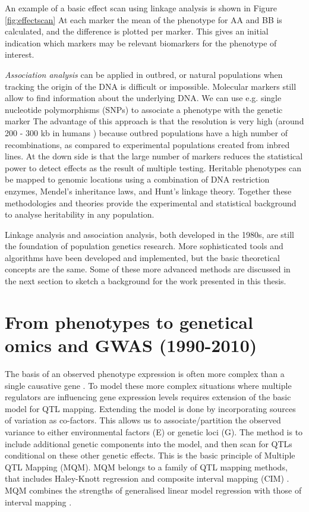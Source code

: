 An example of a basic effect scan using linkage analysis is shown in Figure \ref{fig:effectscan} At each marker the mean of 
the phenotype for AA and BB is calculated, and the difference is plotted per marker. This gives an initial indication which 
markers may be relevant biomarkers for the phenotype of interest.

\emph{Association analysis} can be applied in outbred, or natural populations when tracking the origin of the DNA is difficult 
or impossible. Molecular markers still allow to find information about the underlying DNA. We can use e.g. single nucleotide 
polymorphisms (SNPs) to associate a phenotype with the genetic marker \cite{Mehta:2013} The advantage of this approach is that 
the resolution is very high (around 200 - 300 kb in humans \cite{HapMap:2005}) because outbred populations have a high number of 
recombinations, as compared to experimental populations created from inbred lines. At the down side is that the large number of markers reduces the statistical 
power to detect effects as the result of multiple testing. Heritable phenotypes can be mapped to genomic locations using a 
combination of DNA restriction enzymes, Mendel's inheritance laws, and Hunt's linkage theory. Together these methodologies and 
theories provide the experimental and statistical background to analyse heritability in any population.

Linkage analysis and association analysis, both developed in the 1980s, are still the foundation of population genetics research. 
More sophisticated tools and algorithms have been developed and implemented, but the basic theoretical concepts are the same. 
Some of these more advanced methods are discussed in the next section to sketch a background for the work presented in this 
thesis. 

\section{From phenotypes to genetical omics and GWAS (1990-2010)}

The basis of an observed phenotype expression is often more complex than a single causative gene \cite{Sinha:2006, 
West:2007}. To model these more complex situations where multiple regulators are influencing gene expression levels requires extension of 
the basic model for QTL mapping. Extending the model is done by incorporating sources of variation as co-factors. This 
allows us to associate/partition the observed variance to either environmental factors (E) or genetic loci (G). The method 
is to include additional genetic components into the model, and then scan for QTLs conditional on these other genetic effects. 
This is the basic principle of Multiple QTL Mapping (MQM). MQM belongs to a family of QTL mapping methods, that includes 
Haley-Knott regression \cite{Haley:1992} and composite interval mapping (CIM) \cite{Zeng:1994}. MQM combines the strengths 
of generalised linear model regression with those of interval mapping \cite{Jansen:1993, Jansen:1994b}.

